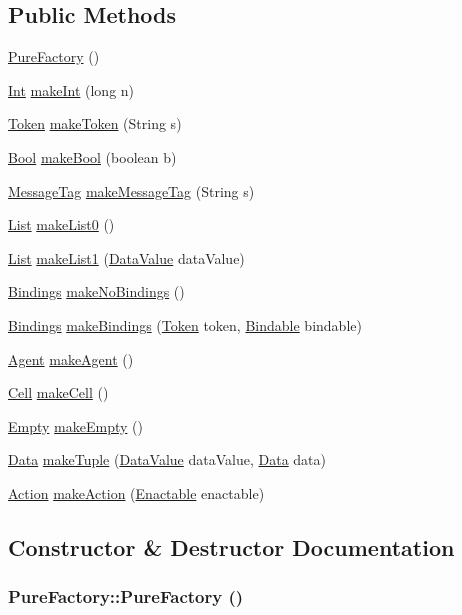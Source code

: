 \subsection*{Public Methods}
\begin{CompactItemize}
\item 
\hyperlink{classPureFactory_a0}{Pure\-Factory} ()
\item 
\hyperlink{interfaceInt}{Int} \hyperlink{classPureFactory_a1}{make\-Int} (long n)
\item 
\hyperlink{interfaceToken}{Token} \hyperlink{classPureFactory_a2}{make\-Token} (String s)
\item 
\hyperlink{interfaceBool}{Bool} \hyperlink{classPureFactory_a3}{make\-Bool} (boolean b)
\item 
\hyperlink{interfaceMessageTag}{Message\-Tag} \hyperlink{classPureFactory_a4}{make\-Message\-Tag} (String s)
\item 
\hyperlink{interfaceList}{List} \hyperlink{classPureFactory_a5}{make\-List0} ()
\item 
\hyperlink{interfaceList}{List} \hyperlink{classPureFactory_a6}{make\-List1} (\hyperlink{interfaceDataValue}{Data\-Value} data\-Value)
\item 
\hyperlink{interfaceBindings}{Bindings} \hyperlink{classPureFactory_a7}{make\-No\-Bindings} ()
\item 
\hyperlink{interfaceBindings}{Bindings} \hyperlink{classPureFactory_a8}{make\-Bindings} (\hyperlink{interfaceToken}{Token} token, \hyperlink{interfaceBindable}{Bindable} bindable)
\item 
\hyperlink{interfaceAgent}{Agent} \hyperlink{classPureFactory_a9}{make\-Agent} ()
\item 
\hyperlink{interfaceCell}{Cell} \hyperlink{classPureFactory_a10}{make\-Cell} ()
\item 
\hyperlink{interfaceEmpty}{Empty} \hyperlink{classPureFactory_a11}{make\-Empty} ()
\item 
\hyperlink{interfaceData}{Data} \hyperlink{classPureFactory_a12}{make\-Tuple} (\hyperlink{interfaceDataValue}{Data\-Value} data\-Value, \hyperlink{interfaceData}{Data} data)
\item 
\hyperlink{interfaceAction}{Action} \hyperlink{classPureFactory_a13}{make\-Action} (\hyperlink{interfaceEnactable}{Enactable} enactable)
\end{CompactItemize}


\subsection{Constructor \& Destructor Documentation}
\hypertarget{classPureFactory_a0}{
\subsubsection[PureFactory]{\setlength{\rightskip}{0pt plus 5cm}Pure\-Factory::Pure\-Factory ()}}
\label{classPureFactory_a0}




